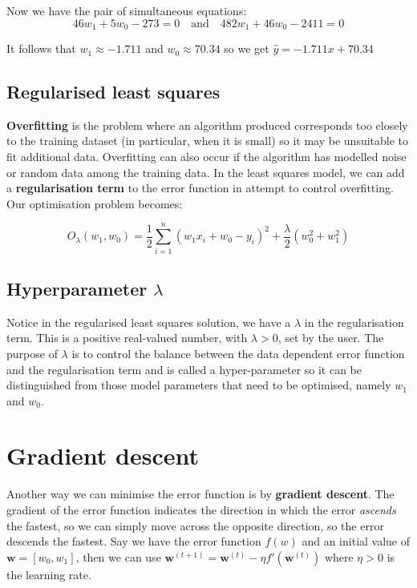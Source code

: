 \documentclass[11pt,fleqn]{book} %
\begin{document}
\noindent
Now we have the pair of simultaneous equations:
$$46w_1 + 5w_0 - 273 = 0 \quad \text{and} \quad 482w_1 + 46w_0 - 2411 = 0$$

\noindent
It follows that $w_1 \approx -1.711$ and $w_0 \approx 70.34$ so we get $\hat{y} = -1.711x + 70.34$

\subsection{Regularised least squares}
\textbf{Overfitting} is the problem where an algorithm produced corresponds too closely to the training dataset (in particular, when it is small) so it may be unsuitable to fit additional data. Overfitting can also occur if the algorithm has modelled noise or random data among the training data. In the least squares model, we can add a \textbf{regularisation term} to the error function in attempt to control overfitting. Our optimisation problem becomes:

$$O_\lambda (w_1, w_0) = \frac{1}{2}\sum^n_{i = 1}(w_1x_i + w_0 - y_i)^2 + \frac{\lambda}{2}(w_0^2 + w_1^2)$$

\subsection*{Hyperparameter $\lambda$}
Notice in the regularised least squares solution, we have a $\lambda$ in the regularisation term. This is a positive real-valued number, with $\lambda > 0$, set by the user. The purpose of $\lambda$ is to control the balance between the data dependent error function and the regularisation term and is called a hyper-parameter so it can be distinguished from those model parameters that need to be optimised, namely $w_1$ and $w_0$.

\section{Gradient descent}
Another way we can minimise the error function is by \textbf{gradient descent}. The gradient of the error function indicates the direction in which the error \textit{ascends} the fastest, so we can simply move across the opposite direction, so the error descends the fastest. Say we have the error function $f(w)$ and an initial value of $\bm{w} = [w_0, w_1]$, then we can use $\bm{w}^{(t+1)} = \bm{w}^{(t)} - \eta f'(\bm{w}^{(t)})$ where $\eta > 0$ is the learning rate.
\end{document}
